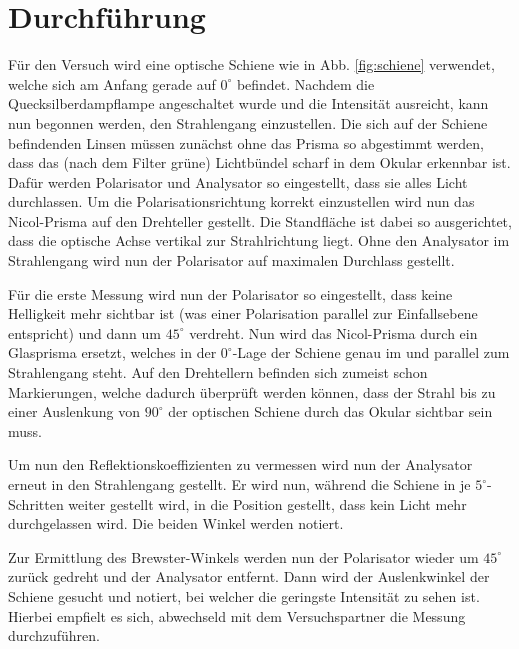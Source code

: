 \documentclass[12pt,a4paper,titlepage,headinclude,bibtotoc]{scrartcl}
\begin{document}
\section{Durchführung}
\label{sec:durchfuehrung}
Für den Versuch wird eine optische Schiene wie in Abb. \ref{fig:schiene} verwendet, welche sich am Anfang gerade auf $0^\circ $  befindet.
Nachdem die Quecksilberdampflampe angeschaltet wurde und die Intensität ausreicht, kann nun begonnen werden, den Strahlengang einzustellen.
Die sich auf der Schiene befindenden Linsen müssen zunächst ohne das Prisma so abgestimmt werden, dass das (nach dem Filter grüne) Lichtbündel scharf in dem Okular erkennbar ist.
Dafür werden Polarisator und Analysator so eingestellt, dass sie alles Licht durchlassen.
Um die Polarisationsrichtung korrekt einzustellen wird nun das Nicol-Prisma auf den Drehteller gestellt.
Die Standfläche ist dabei so ausgerichtet, dass die optische Achse vertikal zur Strahlrichtung liegt.
Ohne den Analysator im Strahlengang wird nun der Polarisator auf maximalen Durchlass gestellt.


Für die erste Messung wird nun der Polarisator so eingestellt, dass keine Helligkeit mehr sichtbar ist (was einer Polarisation parallel zur Einfallsebene entspricht) und dann um $45^\circ$ verdreht.
Nun wird das Nicol-Prisma durch ein Glasprisma ersetzt, welches in der $0^\circ$-Lage der Schiene genau im und parallel zum Strahlengang steht.
Auf den Drehtellern befinden sich zumeist schon Markierungen, welche  dadurch überprüft werden können, dass der Strahl bis zu einer Auslenkung von $90^\circ$ der optischen Schiene durch das Okular sichtbar sein muss.

Um nun den Reflektionskoeffizienten zu vermessen wird nun der Analysator erneut in den Strahlengang gestellt.
Er wird nun, während die Schiene in je $5^\circ$-Schritten weiter gestellt wird, in die Position gestellt, dass kein Licht mehr durchgelassen wird.
Die beiden Winkel werden notiert.

Zur Ermittlung des Brewster-Winkels werden nun der Polarisator wieder um $45^\circ$ zurück gedreht und der Analysator entfernt.
Dann wird der Auslenkwinkel der Schiene gesucht und notiert, bei welcher die geringste Intensität zu sehen ist.
Hierbei empfielt es sich, abwechseld mit dem Versuchspartner die Messung durchzuführen.
\end{document}
